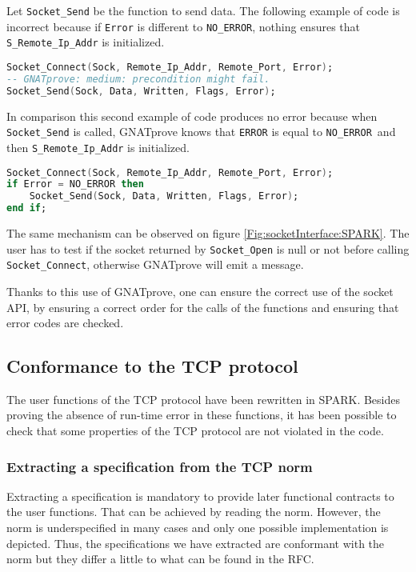 \documentclass[runningheads]{llncs}
\begin{document}
    Let \lstinline{Socket_Send} be the function to send data. The following example of code is incorrect because if \lstinline{Error} is
    different to \lstinline{NO_ERROR}, nothing ensures that \lstinline{S_Remote_Ip_Addr} is initialized.
    \begin{lstlisting}[language=Ada]
Socket_Connect(Sock, Remote_Ip_Addr, Remote_Port, Error);
-- GNATprove: medium: precondition might fail.
Socket_Send(Sock, Data, Written, Flags, Error);
    \end{lstlisting}
    In comparison this second example of code produces no error because when \lstinline{Socket_Send} is called, GNATprove knows that
    \lstinline{ERROR} is equal to \lstinline{NO_ERROR} and then \lstinline{S_Remote_Ip_Addr} is initialized.
    \begin{lstlisting}[language=Ada]
Socket_Connect(Sock, Remote_Ip_Addr, Remote_Port, Error);
if Error = NO_ERROR then
    Socket_Send(Sock, Data, Written, Flags, Error);
end if;
    \end{lstlisting}

    The same mechanism can be observed on figure \ref{Fig:socketInterface:SPARK}. The user has to test if the socket returned by
    \lstinline{Socket_Open} is null or not before calling \lstinline{Socket_Connect}, otherwise GNATprove will emit a message.

    Thanks to this use of GNATprove, one can ensure the correct use of the socket API, by ensuring a correct order for the
    calls of the functions and ensuring that error codes are checked.


\subsection{Conformance to the TCP protocol}

    The user functions of the TCP protocol have been rewritten in SPARK. Besides proving the absence of run-time error in these functions,
    it has been possible to check that some properties of the TCP protocol are not violated in the code.

\subsubsection{Extracting a specification from the TCP norm}

    Extracting a specification is mandatory to provide later functional contracts to the user functions.
    That can be achieved by reading the norm. However, the norm is underspecified in many cases and only one possible implementation
    is depicted. Thus, the specifications we have extracted are conformant with the norm but they differ a little to
    what can be found in the RFC.
\end{document}
